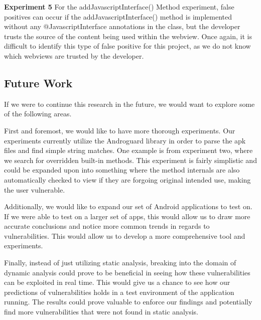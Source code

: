 \textbf{Experiment 5}
For the addJavascriptInterface() Method experiment, false positives can occur if the addJavascriptInterface() method is implemented without any @JavascriptInterface annotations in the class, but the developer 
trusts the source of the content being used within the webview. Once again, it is difficult to identify this type of false positive for this project, as we do not know which webviews are trusted by the developer. 

\subsection{Future Work}
If we were to continue this research in the future, we would 
want to explore some of the following areas. 

First and foremost, we would like to have more thorough experiments. 
Our experiments currently utilize the Androguard library in 
order to parse the apk files and find simple string matches. 
One example is from experiment two, where we search for 
overridden built-in methods. This experiment is fairly simplistic
and could be expanded upon into something where the method 
internals are also automatically checked to view if they are 
forgoing original intended use, making the user vulnerable.

Additionally, we would like to expand our set of Android 
applications to test on. If we were able to test on a larger 
set of apps, this would allow us to draw more accurate 
conclusions and notice more common trends in regards to 
vulnerabilities. This would allow us to develop a more 
comprehensive tool and experiments. 

Finally, instead of just utilizing static analysis, breaking 
into the domain of dynamic analysis could prove to be beneficial 
in seeing how these vulnerabilities can be exploited in real time. 
This would give us a chance to see how our predictions of 
vulnerabilities holds in a test environment of the application 
running. The results could prove valuable to enforce our 
findings and potentially find more vulnerabilities that were 
not found in static analysis. 
